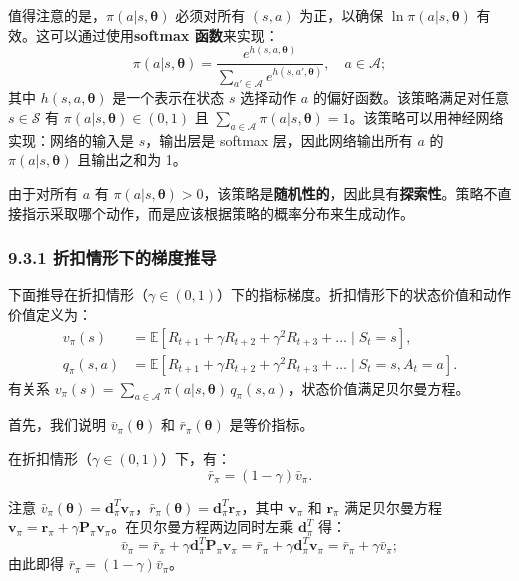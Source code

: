 \documentclass[UTF8]{article}
\begin{document}
\begin{remarkbox}
值得注意的是，$\pi(a|s, \boldsymbol{\theta})$ 必须对所有 $(s,a)$ 为正，以确保 $\ln \pi(a|s, \boldsymbol{\theta})$ 有效。这可以通过使用\textbf{softmax 函数}来实现：
\[
\pi(a|s, \boldsymbol{\theta}) = \frac{e^{h(s,a,\boldsymbol{\theta})}}{\sum_{a' \in \mathcal{A}} e^{h(s,a',\boldsymbol{\theta})}}, \quad a \in \mathcal{A};
\]
其中 $h(s, a, \boldsymbol{\theta})$ 是一个表示在状态 $s$ 选择动作 $a$ 的偏好函数。该策略满足对任意 $s \in \mathcal{S}$ 有 $\pi(a|s, \boldsymbol{\theta}) \in (0,1)$ 且 $\sum_{a \in \mathcal{A}} \pi(a|s, \boldsymbol{\theta}) = 1$。该策略可以用神经网络实现：网络的输入是 $s$，输出层是 softmax 层，因此网络输出所有 $a$ 的 $\pi(a|s, \boldsymbol{\theta})$ 且输出之和为 1。

由于对所有 $a$ 有 $\pi(a|s, \boldsymbol{\theta}) > 0$，该策略是\textbf{随机性的}，因此具有\textbf{探索性}。策略不直接指示采取哪个动作，而是应该根据策略的概率分布来生成动作。
\end{remarkbox}

\subsubsection*{9.3.1 折扣情形下的梯度推导}

下面推导在折扣情形（$\gamma \in (0,1)$）下的指标梯度。折扣情形下的状态价值和动作价值定义为：
\begin{align*}
v_\pi(s) &= \mathbb{E}[R_{t+1} + \gamma R_{t+2} + \gamma^2 R_{t+3} + \dots \mid S_t = s], \\
q_\pi(s,a) &= \mathbb{E}[R_{t+1} + \gamma R_{t+2} + \gamma^2 R_{t+3} + \dots \mid S_t = s, A_t = a].
\end{align*}
有关系 $v_\pi(s) = \sum_{a \in \mathcal{A}} \pi(a|s, \boldsymbol{\theta}) \, q_\pi(s,a)$，状态价值满足贝尔曼方程。

首先，我们说明 $\bar{v}_\pi(\boldsymbol{\theta})$ 和 $\bar{r}_\pi(\boldsymbol{\theta})$ 是等价指标。

\begin{theorembox}
    在折扣情形（$\gamma \in (0,1)$）下，有：
    \[
    \bar{r}_\pi = (1 - \gamma) \bar{v}_\pi.
    \]
\end{theorembox}

\begin{proofbox}
注意 $\bar{v}_\pi(\boldsymbol{\theta}) = \boldsymbol{d}_\pi^T \boldsymbol{v}_\pi$，$\bar{r}_\pi(\boldsymbol{\theta}) = \boldsymbol{d}_\pi^T \boldsymbol{r}_\pi$，其中 $\boldsymbol{v}_\pi$ 和 $\boldsymbol{r}_\pi$ 满足贝尔曼方程 $\boldsymbol{v}_\pi = \boldsymbol{r}_\pi + \gamma \boldsymbol{P}_\pi \boldsymbol{v}_\pi$。在贝尔曼方程两边同时左乘 $\boldsymbol{d}_\pi^T$ 得：
\[
\bar{v}_\pi = \bar{r}_\pi + \gamma \boldsymbol{d}_\pi^T \boldsymbol{P}_\pi \boldsymbol{v}_\pi = \bar{r}_\pi + \gamma \boldsymbol{d}_\pi^T \boldsymbol{v}_\pi = \bar{r}_\pi + \gamma \bar{v}_\pi;
\]
由此即得 $\bar{r}_\pi = (1 - \gamma) \bar{v}_\pi$。
\end{proofbox}
\end{document}
